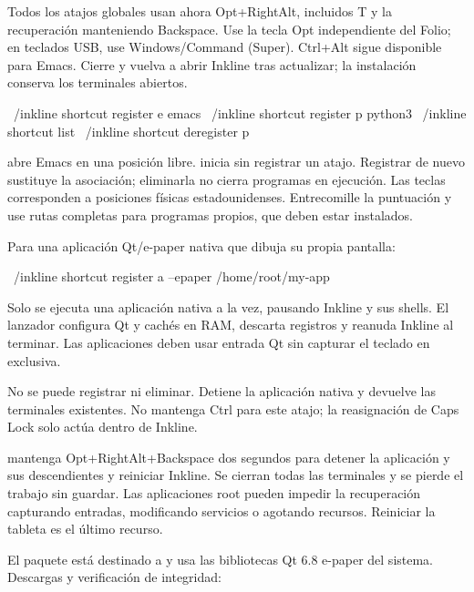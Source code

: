Todos los atajos globales usan ahora Opt+RightAlt, incluidos T y la recuperación manteniendo Backspace. Use la tecla Opt independiente del Folio; en teclados USB, use Windows/Command (Super). Ctrl+Alt sigue disponible para Emacs. Cierre y vuelva a abrir Inkline tras actualizar; la instalación conserva los terminales abiertos.

\begin{shell}
~/inkline shortcut register e emacs
~/inkline shortcut register p python3
~/inkline shortcut list
~/inkline shortcut deregister p
\end{shell}

 abre Emacs en una posición libre.
 inicia sin registrar un atajo.
Registrar de nuevo sustituye la asociación; eliminarla no cierra programas en
ejecución. Las teclas corresponden a posiciones físicas estadounidenses.
Entrecomille la puntuación y use rutas completas para programas propios,
que deben estar instalados.

Para una aplicación Qt/e-paper nativa que dibuja su propia pantalla:
\begin{shell}
~/inkline shortcut register a --epaper /home/root/my-app
\end{shell}
Solo se ejecuta una aplicación nativa a la vez, pausando Inkline y sus shells.
El lanzador configura Qt y cachés en RAM, descarta registros y reanuda Inkline
al terminar. Las aplicaciones deben usar entrada Qt sin capturar el teclado en exclusiva.

\begin{notice}
 No se puede registrar ni eliminar.
Detiene la aplicación nativa y devuelve las terminales existentes.
No mantenga Ctrl para este atajo; la reasignación de Caps Lock solo actúa dentro de Inkline.
\end{notice}

 mantenga Opt+RightAlt+Backspace dos segundos para detener la
aplicación y sus descendientes y reiniciar Inkline. Se cierran todas las
terminales y se pierde el trabajo sin guardar. Las aplicaciones root pueden
impedir la recuperación capturando entradas, modificando servicios o agotando
recursos. Reiniciar la tableta es el último recurso.

El paquete está destinado a  y usa las
bibliotecas Qt 6.8 e-paper del sistema. Descargas y verificación de integridad:

